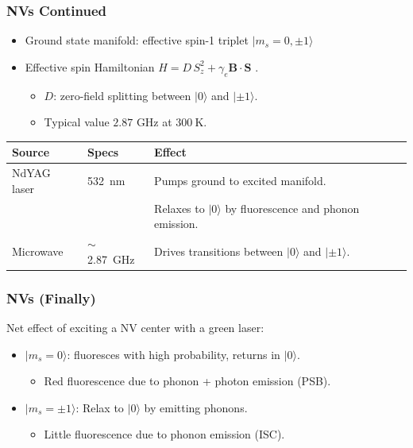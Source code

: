 \documentclass{beamer}
\begin{document}
\begin{frame}
    \frametitle{NVs Continued} 
    \begin{itemize}
        \item Ground state manifold: effective spin-1 triplet $|m_s=0, \pm 1\rangle$
        \item Effective spin Hamiltonian $H = D\, S_z^2 + \gamma_e {\mathbf{B}} \cdot {\mathbf{S}}$ \cite{Prasad2018NVNotes}. 
        \begin{itemize}
            \item $D$: zero-field splitting between $|0\rangle$ and $|\pm 1\rangle$. 
            \item Typical value $2.87$ GHz at $\SI{300}{\kelvin}$. 
        \end{itemize}
    \end{itemize}
    \begin{table}
        \centering
        {\small %
        \begin{tabular}{ll>{\scriptsize}l} %
            \toprule
            Source & Specs & Effect \\
            \midrule
            NdYAG laser & \SI{532}{\nano\meter} & 
            Pumps ground to excited manifold. \\ 
             & & Relaxes to $|0\rangle$ by fluorescence and phonon emission. \\
            Microwave & $\sim$\SI{2.87}{\giga\hertz} & Drives transitions between $|0\rangle$ and $|\pm 1\rangle$. \\
            \bottomrule
        \end{tabular}
        } %
        \label{tab:radiation_effects}
    \end{table}
\end{frame}

\begin{frame}
    \frametitle{NVs (Finally)} 
    Net effect of exciting a NV center with a green laser: 
    \begin{itemize}
        \item $|m_s=0\rangle$: fluoresces with high probability, returns in $|0\rangle$. 
        \begin{itemize}
            \item Red fluorescence due to phonon + photon emission (PSB). 
        \end{itemize}
        \item $|m_s=\pm 1\rangle$: Relax to $|0\rangle$ by emitting phonons. 
        \begin{itemize}
            \item Little fluorescence due to phonon emission (ISC). 
        \end{itemize}
    \end{itemize}
    
\end{frame}
\end{document}
